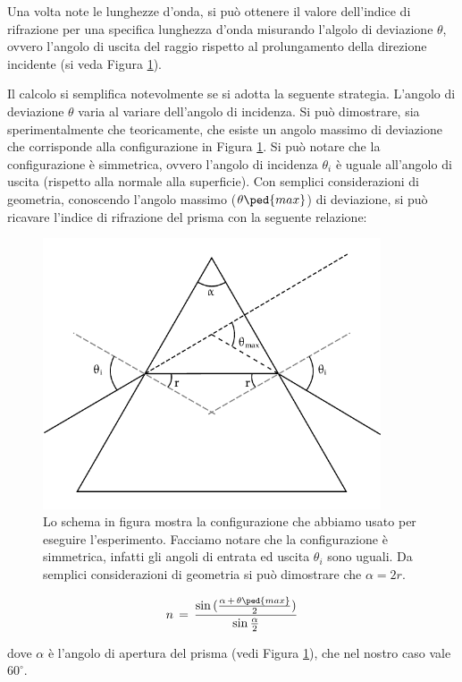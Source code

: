 Una volta note le lunghezze d'onda, si può ottenere il valore dell'indice di rifrazione per una specifica lunghezza d'onda misurando l'algolo di deviazione $\theta$, ovvero l'angolo di uscita del raggio rispetto al prolungamento della direzione incidente (si veda Figura \ref{fig:prisma}).

Il calcolo si semplifica notevolmente se si adotta la seguente strategia. L'angolo di deviazione $\theta$ varia al variare dell'angolo di incidenza. Si può dimostrare, sia sperimentalmente che teoricamente, che esiste un angolo massimo di deviazione che corrisponde alla configurazione in Figura \ref{fig:prisma}. Si può notare che la configurazione è simmetrica, ovvero l'angolo di incidenza $\theta_i$ è uguale all'angolo di uscita (rispetto alla normale alla superficie). Con semplici considerazioni di geometria, conoscendo l'angolo massimo ($\theta\ped{max}$) di deviazione, si può ricavare l'indice di rifrazione del prisma con la seguente relazione:

\begin{figure}
    \includegraphics[width=10cm]{prisma1.pdf}
    \caption{Lo schema in figura mostra la configurazione che abbiamo usato per eseguire l'esperimento. Facciamo notare che la configurazione è simmetrica, infatti gli angoli di entrata ed uscita $\theta_i$ sono uguali. Da semplici considerazioni di geometria si può dimostrare che $\alpha = 2r$.}
    \label{fig:prisma}
\end{figure}

\begin{equation}
	n \,=\, \frac{\sin{(\frac{\alpha \,+\, \theta\ped{max}}{2})}}{\sin{\frac{\alpha}{2}}}
	\label{indice_rif}
\end{equation}

dove $\alpha$ è l'angolo di apertura del prisma (vedi Figura \ref{fig:prisma}), che nel nostro caso vale $60^\circ$.

